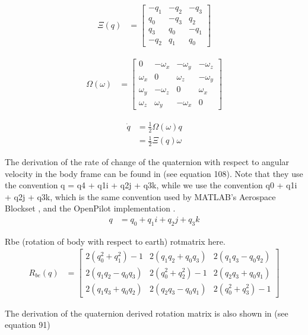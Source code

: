 \documentclass[]{article}
\begin{document}
{\begin{align}
	\Xi(q) &=
	\left[
	\begin{matrix}
		-q_1 	& -q_2	& -q_3 	\\
		q_0		& -q_3 	& q_2 	\\
		q_3 	& q_0 	& -q_1 	\\
		-q_2 	& q_1 	& q_0
	\end{matrix}
	\right]
\end{align}

\begin{align}
	\Omega(\omega) &=
	\left[
	\begin{matrix}
		0 			& -\omega_x 	& -\omega_y	& -\omega_z	\\
		\omega_x 	& 0 			& \omega_z 	& -\omega_y \\
		\omega_y 	& -\omega_z 	& 0 		& \omega_x 	\\
		\omega_z 	& \omega_y		& -\omega_x & 0
	\end{matrix}
	\right]
\end{align}

\begin{align}
	\dot{q} 	&= \frac{1}{2} \Omega(\omega) q \\
				&= \frac{1}{2} \Xi(q) \omega
\end{align}

The derivation of the rate of change of the quaternion with respect to angular velocity in the body frame can be found in \cite{MARSlab} (see equation 108). Note that they use the convention q = q4 + q1i + q2j + q3k, while we use the convention q0 + q1i + q2j + q3k, which is the same convention used by MATLAB's Aerospace Blockset \cite{MATLABAerospace}, and the OpenPilot implementation \cite{OpenPilotPaper}.
\begin{align}
	q &= q_0 + q_1i + q_2j + q_3k
\end{align}

Rbe (rotation of body with respect to earth)
rotmatrix here.
\begin{align}
	R_{be}(q) &=
	\left[
	\begin{matrix}
		2(q_0^2 + q_1^2) - 1 	& 2(q_1 q_2 + q_0 q_3) 	& 2(q_1 q_3 - q_0 q_2) \\
		2(q_1 q_2 - q_0 q_3) 	& 2(q_0^2 + q_2^2) - 1 	& 2(q_2 q_3 + q_0 q_1) \\
		2(q_1 q_3 + q_0 q_2)	& 2(q_2 q_3 - q_0 q_1)	& 2(q_0^2 + q_3^2) - 1
	\end{matrix}
	\right]
\end{align}

The derivation of the quaternion derived rotation matrix is also shown in \cite{MARSlab} (see equation 91)

}
\end{document}
